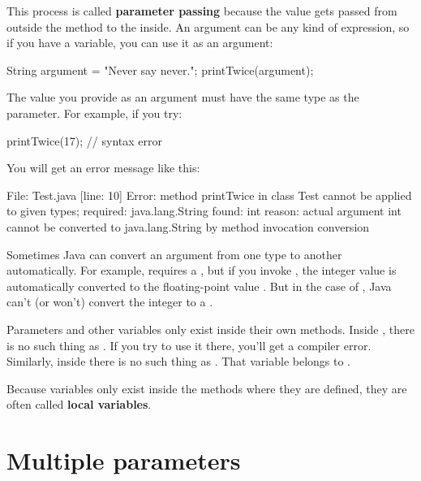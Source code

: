 
This process is called {\bf parameter passing} because the value gets passed from outside the method to the inside.
An argument can be any kind of expression, so if you have a  variable, you can use it as an argument:

\begin{code}
String argument = "Never say never.";
printTwice(argument);
\end{code}

The value you provide as an argument must have the same type as the parameter.
For example, if you try:

\begin{code}
printTwice(17);  // syntax error
\end{code}

You will get an error message like this:

\begin{stdout}
File: Test.java  [line: 10]
Error: method printTwice in class Test cannot be applied
       to given types;
  required: java.lang.String
  found: int
  reason: actual argument int cannot be converted to
          java.lang.String by method invocation conversion
\end{stdout}

Sometimes Java can convert an argument from one type to another automatically.
For example,  requires a , but if you invoke , the integer value  is automatically converted to the floating-point value .
But in the case of , Java can't (or won't) convert the integer  to a .

Parameters and other variables only exist inside their own methods.
Inside , there is no such thing as .
If you try to use it there, you'll get a compiler error.
Similarly, inside  there is no such thing as .
That variable belongs to .


Because variables only exist inside the methods where they are defined, they are often called {\bf local variables}.


\section{Multiple parameters}
\label{time}

